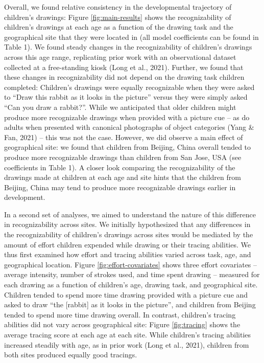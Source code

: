 \documentclass[
  english,
  man]{apa6}
\begin{document}
Overall, we found relative consistency in the developmental trajectory of children's drawings: Figure \ref{fig:main-results} shows the recognizability of children's drawings at each age as a function of the drawing task and the geographical site that they were located in (all model coefficients can be found in Table 1). We found steady changes in the recognizability of children's drawings across this age range, replicating prior work with an observational dataset collected at a free-standing kiosk (Long et al., 2021). Further, we found that these changes in recognizability did not depend on the drawing task children completed: Children's drawings were equally recognizable when they were asked to \enquote{Draw this rabbit as it looks in the picture} versus they were simply asked \enquote{Can you draw a rabbit?}. While we anticipated that older children might produce more recognizable drawings when provided with a picture cue -- as do adults when presented with canonical photographs of object categories (Yang \& Fan, 2021) -- this was not the case. However, we did observe a main effect of geographical site: we found that children from Beijing, China overall tended to produce more recognizable drawings than children from San Jose, USA (see coefficients in Table 1). A closer look comparing the recognizability of the drawings made at children at each age and site hints that the children from Beijing, China may tend to produce more recognizable drawings earlier in development.

In a second set of analyses, we aimed to understand the nature of this difference in recognizability across sites. We initially hypothesized that any differences in the recognizability of children's drawings across sites would be mediated by the amount of effort children expended while drawing or their tracing abilities. We thus first examined how effort and tracing abilities varied across task, age, and geographical location. Figure \ref{fig:effort-covariates} shows three effort covariates -- average intensity, number of strokes used, and time spent drawing -- measured for each drawing as a function of children's age, drawing task, and geographical site. Children tended to spend more time drawing provided with a picture cue and asked to draw \enquote{the {[}rabbit{]} as it looks in the picture}, and children from Beijing tended to spend more time drawing overall. In contrast, children's tracing abilities did not vary across geographical site: Figure \ref{fig:tracing} shows the average tracing score at each age at each site. While children's tracing abilities increased steadily with age, as in prior work (Long et al., 2021), children from both sites produced equally good tracings.
\end{document}
